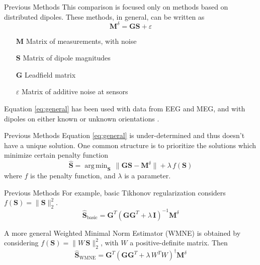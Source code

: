\documentclass[progressbar=head]{beamer}
\newcommand{\ppar}[1]{ \left( #1 \right) }
\DeclareMathOperator*{\argmin}{arg\,min}
\newcommand{\nnorm}[1]{\lVert #1 \rVert}
\newcommand{\G}{\mathbf{G}}
\newcommand{\id}{\mathbf{I}}
\begin{document}
\begin{frame}{Previous Methods}
This comparison is focused only on methods based on distributed dipoles. These methods, in general, can be written as
\begin{equation}
    \mathbf{M}^\delta = \mathbf{G} \mathbf{S} + \varepsilon
    \label{eq:general}
\end{equation}
\begin{itemize}
    \item[$\mathbf{M}$] Matrix of measurements, with noise
    \item[$\mathbf{S}$] Matrix of dipole magnitudes
    \item[$\mathbf{G}$] Leadfield matrix
    \item[$\varepsilon$] Matrix of additive noise at sensors
\end{itemize}

Equation \eqref{eq:general} has been used with %
data from EEG and MEG, and with 
dipoles on either known or unknown orientations
\cite{grech2008review}.

\end{frame}

\begin{frame}{Previous Methods}
Equation \eqref{eq:general} is under-determined and thus doesn't have a unique solution. One common structure is to prioritize the solutions which minimize certain penalty function
\begin{equation}
    \hat{\mathbf{S}} = \argmin_{\mathbf{S}}\, \nnorm{\G \mathbf{S}-\mathbf{M}^\delta} + \lambda\, f\ppar{\mathbf{S}}
    \label{eq:general_min}
\end{equation}
where $f$ is the penalty function, and $\lambda$ is a parameter.

\end{frame}

\begin{frame}{Previous Methods}
    For example, basic Tikhonov regularization considers $f\ppar{\mathbf{S}} = \nnorm{\mathbf{S}}_2^2$. %
\begin{equation}
    \hat{\mathbf{S}}_{\text{basic}}
    =
    \G^T \ppar{\G \G^T + \lambda\, \id}^{-1} \mathbf{M}^\delta
\end{equation}

A more general Weighted Minimal Norm Estimator (WMNE) is obtained by considering
$f\ppar{\mathbf{S}} = \nnorm{W\, \mathbf{S}}_2^2$, with $W$ a positive-definite matrix. Then
\begin{equation}
    \hat{\mathbf{S}}_{\text{WMNE}}
    =
    \G^T \ppar{\G \G^T + \lambda\, W^T W}^{\dagger} \mathbf{M}^\delta
\end{equation}
\end{frame}
\end{document}
